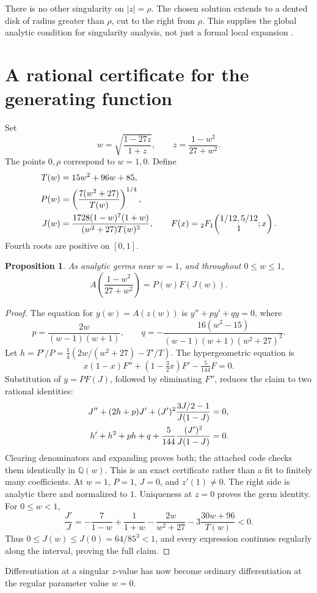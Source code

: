 \documentclass[11pt,letterpaper]{article}
\newtheorem{proposition}[theorem]{Proposition}
\theoremstyle{remark}\newtheorem{remark}[theorem]{Remark}
\newcommand{\Q}{\mathbb Q}\newcommand{\tht}{\vartheta}
\newcommand{\hyp}[4]{{}_2F_1\!\left(\begin{matrix}#1,#2\\#3\end{matrix};#4\right)}
\newcounter{l7gtrsavedeq}
\begin{document}
There is no other singularity on $|z|=\rho$. The chosen solution extends
to a dented disk of radius greater than $\rho$, cut to the right from
$\rho$. This supplies the global analytic condition for singularity
analysis, not just a formal local expansion \cite[Chapter VI]{l7g:flajolet}.

\section{A rational certificate for the generating function}\label{l7g:sec:certificate}
Set
\begin{equation}\label{l7g:eq:w}
 w=\sqrt{\frac{1-27z}{1+z}},\qquad z=\frac{1-w^2}{27+w^2}.
\end{equation}
The points $0,\rho$ correspond to $w=1,0$. Define
\begin{align}\label{l7g:eq:PTJ}
 T(w)&=15w^2+96w+85,\notag\\
 P(w)&=\left(\frac{7(w^2+27)}{T(w)}\right)^{1/4},\notag\\
 J(w)&=\frac{1728(1-w)^7(1+w)}{(w^2+27)T(w)^3},\qquad
 F(x)=\hyp{1/12}{5/12}{1}{x}.
\end{align}
Fourth roots are positive on $[0,1]$.
\begin{proposition}\label{l7g:prop:pullback}
As analytic germs near $w=1$, and throughout $0\le w\le1$,
\begin{equation}\label{l7g:eq:GF}
 A\!\left(\frac{1-w^2}{27+w^2}\right)=P(w)F(J(w)).
\end{equation}
\end{proposition}
\begin{proof}
The equation for $y(w)=A(z(w))$ is $y''+p y'+q y=0$, where
\begin{equation}\label{l7g:eq:wpq}
 p=\frac{2w}{(w-1)(w+1)},\qquad
 q=-\frac{16(w^2-15)}{(w-1)(w+1)(w^2+27)^2}.
\end{equation}
Let $h=P'/P=\tfrac14(2w/(w^2+27)-T'/T)$. The hypergeometric equation
\cite[\S15.10]{l7g:dlmf} is
\begin{equation}\label{l7g:eq:hypODE}
 x(1-x)F''+(1-\tfrac32x)F'-\tfrac5{144}F=0.
\end{equation}
Substitution of $y=PF(J)$, followed by eliminating $F''$, reduces the
claim to two rational identities:
\begin{align}\label{l7g:eq:certs}
 J''+(2h+p)J'+(J')^2\frac{3J/2-1}{J(1-J)}&=0,\notag\\
 h'+h^2+ph+q+\frac5{144}\frac{(J')^2}{J(1-J)}&=0.
\end{align}
Clearing denominators and expanding proves both; the attached code
checks them identically in $\Q(w)$. This is an exact certificate rather
than a fit to finitely many coefficients.
At $w=1$, $P=1$, $J=0$, and $z'(1)\ne0$. The right side is analytic
there and normalized to $1$. Uniqueness at $z=0$ proves the germ identity.
For $0\le w<1$,
\[
\frac{J'}J=-\frac7{1-w}+\frac1{1+w}-\frac{2w}{w^2+27}
                       -3\frac{30w+96}{T(w)}<0.
\]
Thus $0\le J(w)\le J(0)=64/85^3<1$, and every expression continues
regularly along the interval, proving the full claim.
\end{proof}
Differentiation at a singular $z$-value has now become ordinary
differentiation at the regular parameter value $w=0$.
\end{document}
